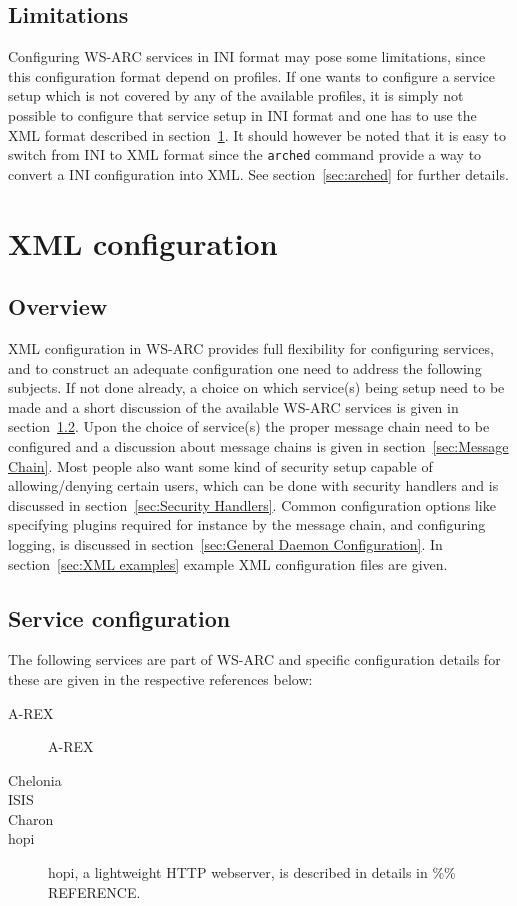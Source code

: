 \documentclass{article}
\begin{document}
\subsection{Limitations}
Configuring WS-ARC services in INI format may pose some limitations, since this
configuration format depend on profiles. If one wants to configure a service
setup which is not covered by any of the available profiles, it is simply not
possible to configure that service setup in INI format and one has to use the
XML format described in section~\ref{sec:XML configuration}. It should however
be noted that it is easy to switch from INI to XML format since the
\texttt{arched} command provide a way to convert a INI configuration into XML.
See section~\ref{sec:arched} for further details.

\section{XML configuration}\label{sec:XML configuration}
\subsection{Overview}
XML configuration in WS-ARC provides full flexibility for configuring services,
and to construct an adequate configuration one need to address the following
subjects. If not done already, a choice on which service(s) being setup need to
be made and a short discussion of the available WS-ARC services is given in
section~\ref{sec:Service configuration}. Upon the choice of service(s) the
proper message chain need to be configured and a discussion about message chains
is given in section~\ref{sec:Message Chain}. Most people also want some kind of
security setup capable of allowing/denying certain users, which can be done with
security handlers and is discussed in section~\ref{sec:Security Handlers}.
Common configuration options like specifying plugins required for instance by
the message chain, and configuring logging, is discussed in
section~\ref{sec:General Daemon Configuration}. In
section~\ref{sec:XML examples} example XML configuration files are given.

\subsection{Service configuration}\label{sec:Service configuration}
The following services are part of WS-ARC and specific configuration details for
these are given in the respective references below:
\begin{description}
\item[A-REX]
  A-REX
\item[Chelonia]
\item[ISIS]
\item[Charon]
\item[hopi]
  hopi, a lightweight HTTP webserver, is described in details in \%\% REFERENCE.

\end{description}
\end{document}
